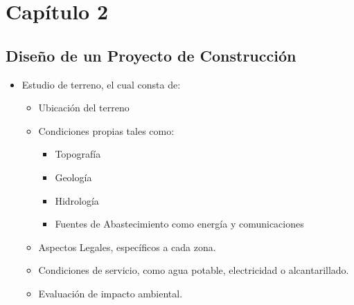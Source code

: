 \documentclass{article} %
\begin{document}
\section{Capítulo 2}

\subsection{Diseño de un Proyecto de Construcción}

\begin{itemize}[label={},left=0pt,align=parleft]
    \item \begin{highlightbox}[levelone] Estudio de terreno, el cual consta de: \end{highlightbox}
    \begin{itemize}[label={},left=1em,align=parleft]
        \item \begin{highlightbox}[leveltwo] Ubicación del terreno \end{highlightbox}
        \item \begin{highlightbox}[leveltwo] Condiciones propias tales como: \end{highlightbox}
        \begin{itemize}[label={},left=2em,align=parleft]
            \item \begin{highlightbox}[levelthree] Topografía \end{highlightbox}
            \item \begin{highlightbox}[levelthree] Geología \end{highlightbox}
            \item \begin{highlightbox}[levelthree] Hidrología \end{highlightbox}
            \item \begin{highlightbox}[levelthree] Fuentes de Abastecimiento como energía y comunicaciones \end{highlightbox}
        \end{itemize}
        \item \begin{highlightbox}[leveltwo] Aspectos Legales, específicos a cada zona. \end{highlightbox}
        \item \begin{highlightbox}[leveltwo] Condiciones de servicio, como agua potable, electricidad o alcantarillado. \end{highlightbox}
        \item \begin{highlightbox}[leveltwo] Evaluación de impacto ambiental. \end{highlightbox}
    \end{itemize}
\end{itemize}
\end{document}
